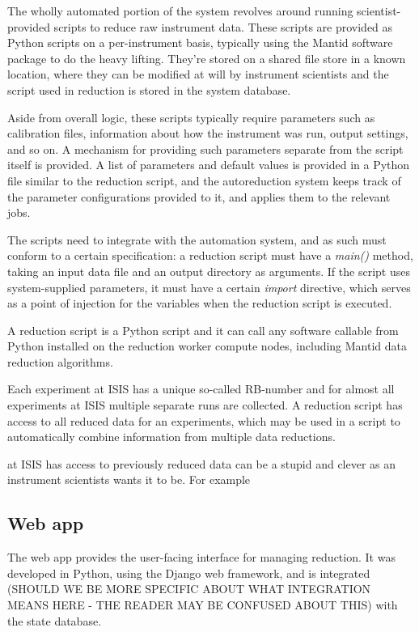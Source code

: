 \documentclass[twocolumn]{article}
\begin{document}
The wholly automated portion of the system revolves around running
scientist-provided scripts to reduce raw instrument data. These scripts
are provided as Python scripts on a per-instrument basis, typically
using the Mantid software package to do the heavy lifting. They're
stored on a shared file store in a known location, where they can be
modified at will by instrument scientists and the script used in
reduction is stored in the system database.

Aside from overall logic, these scripts typically require parameters
such as calibration files, information about how the instrument was run,
output settings, and so on. A mechanism for providing such parameters 
separate from the script itself is provided. A list of parameters and
default values is provided in a Python file similar to the reduction
script, and the autoreduction system keeps track of the parameter
configurations provided to it, and applies them to the relevant jobs.

The scripts need to integrate with the automation system, and
as such must conform to a certain specification: a reduction script must have a
\emph{main()} method, taking an input data file and an output directory as
arguments. If the script uses system-supplied parameters, it must have a
certain \emph{import} directive, which serves as a point of injection
for the variables when the reduction script is executed.

A reduction script is a Python script and it can call any software 
callable from Python installed on the reduction worker compute nodes,
including Mantid data reduction algorithms.

Each experiment at ISIS has a unique so-called RB-number
and for almost all experiments at ISIS multiple separate runs are collected.
A reduction script has access to all reduced data for an experiments, which 
may be used in a script to automatically combine information from multiple 
data reductions.

at ISIS has access to previously reduced data can be a stupid and clever as an instrument
scientists wants it to be. For example

\subsection{Web app}\label{web-app}

The web app provides the user-facing interface for managing reduction.
It was developed in Python, using the Django web framework, and is
integrated (SHOULD WE BE MORE SPECIFIC ABOUT WHAT INTEGRATION
MEANS HERE - THE READER MAY BE CONFUSED ABOUT THIS) with the state database.
\end{document}
